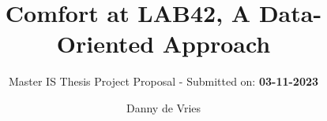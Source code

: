 \title{{Comfort at LAB42, A Data-Oriented Approach}}
\subtitle{Master IS Thesis Project Proposal - Submitted on: \textbf{03-11-2023}}

\author{Danny de Vries}
